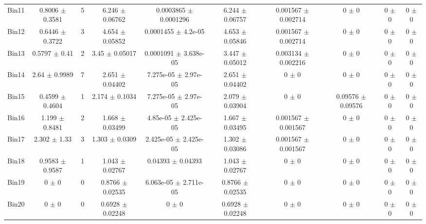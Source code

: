 \begin{tabular}{@{\extracolsep{4pt}}lccccccccc@{}}
     Bin11 & 0.8006 $\pm$ 0.3581 & 5 & 6.246 $\pm$ 0.06762 & 0.0003865 $\pm$ 0.0001296 & 6.244 $\pm$ 0.06757 & 0.001567 $\pm$ 0.002714 & 0 $\pm$ 0 & 0 $\pm$ 0 & 0 $\pm$ 0 \\ 
     Bin12 & 0.6446 $\pm$ 0.3722 & 3 & 4.654 $\pm$ 0.05852 & 0.0001455 $\pm$ 4.2e-05 & 4.653 $\pm$ 0.05846 & 0.001567 $\pm$ 0.002714 & 0 $\pm$ 0 & 0 $\pm$ 0 & 0 $\pm$ 0 \\ 
     Bin13 & 0.5797 $\pm$ 0.41 & 2 & 3.45 $\pm$ 0.05017 & 0.0001091 $\pm$ 3.638e-05 & 3.447 $\pm$ 0.05012 & 0.003134 $\pm$ 0.002216 & 0 $\pm$ 0 & 0 $\pm$ 0 & 0 $\pm$ 0 \\ 
     Bin14 & 2.64 $\pm$ 0.9989 & 7 & 2.651 $\pm$ 0.04402 & 7.275e-05 $\pm$ 2.97e-05 & 2.651 $\pm$ 0.04402 & 0 $\pm$ 0 & 0 $\pm$ 0 & 0 $\pm$ 0 & 0 $\pm$ 0 \\ 
     Bin15 & 0.4599 $\pm$ 0.4604 & 1 & 2.174 $\pm$ 0.1034 & 7.275e-05 $\pm$ 2.97e-05 & 2.079 $\pm$ 0.03904 & 0 $\pm$ 0 & 0.09576 $\pm$ 0.09576 & 0 $\pm$ 0 & 0 $\pm$ 0 \\ 
     Bin16 & 1.199 $\pm$ 0.8481 & 2 & 1.668 $\pm$ 0.03499 & 4.85e-05 $\pm$ 2.425e-05 & 1.667 $\pm$ 0.03495 & 0.001567 $\pm$ 0.001567 & 0 $\pm$ 0 & 0 $\pm$ 0 & 0 $\pm$ 0 \\ 
     Bin17 & 2.302 $\pm$ 1.33 & 3 & 1.303 $\pm$ 0.0309 & 2.425e-05 $\pm$ 2.425e-05 & 1.302 $\pm$ 0.03086 & 0.001567 $\pm$ 0.001567 & 0 $\pm$ 0 & 0 $\pm$ 0 & 0 $\pm$ 0 \\ 
     Bin18 & 0.9583 $\pm$ 0.9587 & 1 & 1.043 $\pm$ 0.02767 & 0.04393 $\pm$ 0.04393 & 1.043 $\pm$ 0.02767 & 0 $\pm$ 0 & 0 $\pm$ 0 & 0 $\pm$ 0 & 0 $\pm$ 0 \\ 
     Bin19 & 0 $\pm$ 0 & 0 & 0.8766 $\pm$ 0.02535 & 6.063e-05 $\pm$ 2.711e-05 & 0.8766 $\pm$ 0.02535 & 0 $\pm$ 0 & 0 $\pm$ 0 & 0 $\pm$ 0 & 0 $\pm$ 0 \\ 
     Bin20 & 0 $\pm$ 0 & 0 & 0.6928 $\pm$ 0.02248 & 0 $\pm$ 0 & 0.6928 $\pm$ 0.02248 & 0 $\pm$ 0 & 0 $\pm$ 0 & 0 $\pm$ 0 & 0 $\pm$ 0 \\ 
\hline\hline
  \end{tabular}
